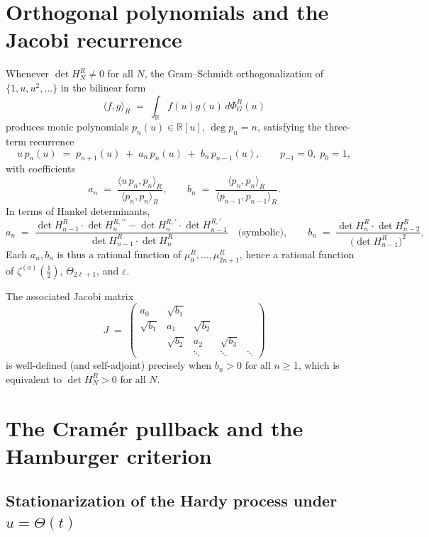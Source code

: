 \documentclass[11pt]{amsart}
\theoremstyle{definition}
\begin{document}
\section{Orthogonal polynomials and the Jacobi recurrence}

Whenever $\det H_{N}^{R}\ne 0$ for all $N$, the Gram--Schmidt orthogonalization
of $\{1,u,u^{2},\ldots\}$ in the bilinear form
\[
\langle f,g\rangle_{R}\;=\;\int_{\mathbb{R}}f(u)g(u)\,d\Phi_{G}^{R}(u)
\]
produces monic polynomials $p_{n}(u)\in\mathbb{R}[u]$, $\deg p_{n}=n$,
satisfying the three-term recurrence
\begin{equation}\label{eq:ttrr}
u\,p_{n}(u)\;=\;p_{n+1}(u)\;+\;a_{n}\,p_{n}(u)\;+\;b_{n}\,p_{n-1}(u),\qquad p_{-1}=0,\;p_{0}=1,
\end{equation}
with coefficients
\begin{equation}\label{eq:ab}
a_{n}\;=\;\frac{\langle u\,p_{n},p_{n}\rangle_{R}}{\langle p_{n},p_{n}\rangle_{R}},\qquad
b_{n}\;=\;\frac{\langle p_{n},p_{n}\rangle_{R}}{\langle p_{n-1},p_{n-1}\rangle_{R}}.
\end{equation}
In terms of Hankel determinants,
\begin{equation}\label{eq:hankel-ab}
a_{n}\;=\;\frac{\det H_{n-1}^{R}\cdot\det H_{n}^{R,\prime\prime}-\det H_{n}^{R,\prime}\cdot\det H_{n-1}^{R,\prime}}{\det H_{n-1}^{R}\cdot\det H_{n}^{R}}\quad\text{(symbolic)},\qquad
b_{n}\;=\;\frac{\det H_{n}^{R}\cdot\det H_{n-2}^{R}}{\bigl(\det H_{n-1}^{R}\bigr)^{2}}.
\end{equation}
Each $a_{n},b_{n}$ is thus a rational function of $\mu_{0}^{R},\ldots,\mu_{2n+1}^{R}$, hence a rational function of $\zeta^{(a)}(\tfrac12)$, $\Theta_{2\ell+1}$, and $\varepsilon$.

The associated Jacobi matrix
\[
J\;=\;\begin{pmatrix}a_{0}&\sqrt{b_{1}}&&&\\\sqrt{b_{1}}&a_{1}&\sqrt{b_{2}}&&\\&\sqrt{b_{2}}&a_{2}&\sqrt{b_{3}}&\\&&\ddots&\ddots&\ddots\end{pmatrix}
\]
is well-defined (and self-adjoint) precisely when $b_{n}>0$ for all $n\ge 1$,
which is equivalent to $\det H_{N}^{R}>0$ for all $N$.

\section{The Cram\'er pullback and the Hamburger criterion}

\subsection*{Stationarization of the Hardy process under $u=\Theta(t)$}
\end{document}
